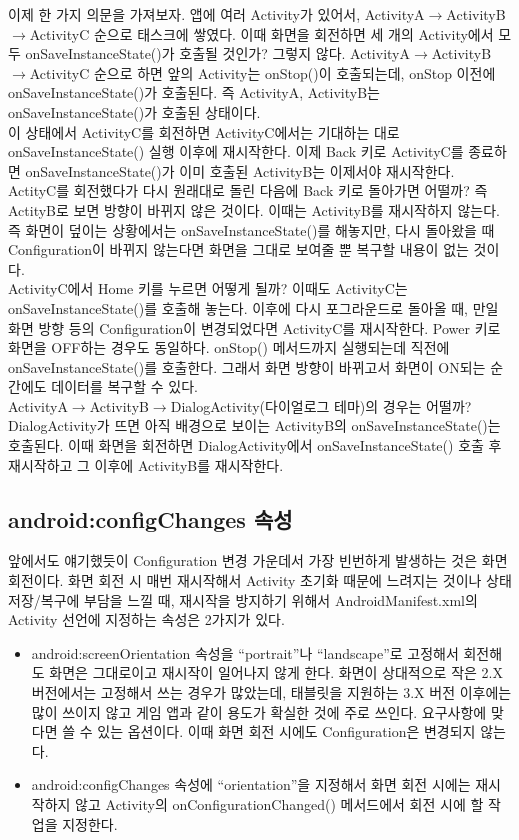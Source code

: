 이제 한 가지 의문을 가져보자.
앱에 여러 Activity가 있어서, ActivityA$\rightarrow$ActivityB$\rightarrow$ActivityC 순으로 태스크에 쌓였다. 이때 화면을 회전하면 세 개의 Activity에서 모두 onSaveInstanceState()가 호출될 것인가? 그렇지 않다.
ActivityA$\rightarrow$ActivityB$\rightarrow$ActivityC 순으로 하면 앞의 Activity는 onStop()이 호출되는데, onStop 이전에 onSaveInstanceState()가 호출된다.
즉 ActivityA, ActivityB는 onSaveInstanceState()가 호출된 상태이다.\\

이 상태에서 ActivityC를 회전하면 ActivityC에서는 기대하는 대로 onSaveInstanceState() 실행 이후에 재시작한다.
이제 Back 키로 ActivityC를 종료하면 onSaveInstanceState()가 이미 호출된 ActivityB는 이제서야 재시작한다.\\

ActityC를 회전했다가 다시 원래대로 돌린 다음에 Back 키로 돌아가면 어떨까? 즉 ActityB로 보면 방향이 바뀌지 않은 것이다.
이때는 ActivityB를 재시작하지 않는다. 즉 화면이 덮이는 상황에서는 onSaveInstanceState()를 해놓지만, 다시 돌아왔을 때 Configuration이 바뀌지 않는다면 화면을 그대로 보여줄 뿐 복구할 내용이 없는 것이다.\\

ActivityC에서 Home 키를 누르면 어떻게 될까? 이때도 ActivityC는 onSaveInstanceState()를 호출해 놓는다.
이후에 다시 포그라운드로 돌아올 때, 만일 화면 방향 등의 Configuration이 변경되었다면 ActivityC를 재시작한다. Power 키로 화면을 OFF하는 경우도 동일하다. onStop() 메서드까지 실행되는데 직전에 onSaveInstanceState()를 호출한다. 그래서 화면 방향이 바뀌고서 화면이 ON되는 순간에도 데이터를 복구할 수 있다.\\

ActivityA$\rightarrow$ActivityB$\rightarrow$DialogActivity(다이얼로그 테마)의 경우는 어떨까?
DialogActivity가 뜨면 아직 배경으로 보이는 ActivityB의 onSaveInstanceState()는 호출된다.
이때 화면을 회전하면 DialogActivity에서 onSaveInstanceState() 호출 후 재시작하고 그 이후에 ActivityB를 재시작한다.\\

\subsection{android:configChanges 속성}
앞에서도 얘기했듯이 Configuration 변경 가운데서 가장 빈번하게 발생하는 것은 화면 회전이다. 화면 회전 시 매번 재시작해서 Activity 초기화 때문에 느려지는 것이나 상태 저장/복구에 부담을 느낄 때, 재시작을 방지하기 위해서 AndroidManifest.xml의 Activity 선언에 지정하는 속성은 2가지가 있다.
\begin{itemize}
\item android:screenOrientation 속성을 ``portrait''나 ``landscape''로 고정해서 회전해도 화면은 그대로이고 재시작이 일어나지 않게 한다. 화면이 상대적으로 작은 2.X 버전에서는 고정해서 쓰는 경우가 많았는데, 태블릿을 지원하는 3.X 버전 이후에는 많이 쓰이지 않고 게임 앱과 같이 용도가 확실한 것에 주로 쓰인다. 요구사항에 맞다면 쓸 수 있는 옵션이다. 이때 화면 회전 시에도 Configuration은 변경되지 않는다.
\item android:configChanges 속성에 ``orientation''을 지정해서 화면 회전 시에는 재시작하지 않고 Activity의 onConfigurationChanged() 메서드에서 회전 시에 할 작업을 지정한다.
\end{itemize}

